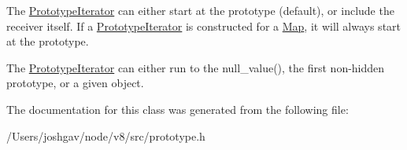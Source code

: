 The \hyperlink{classv8_1_1internal_1_1_prototype_iterator}{Prototype\+Iterator} can either start at the prototype (default), or include the receiver itself. If a \hyperlink{classv8_1_1internal_1_1_prototype_iterator}{Prototype\+Iterator} is constructed for a \hyperlink{classv8_1_1internal_1_1_map}{Map}, it will always start at the prototype.

The \hyperlink{classv8_1_1internal_1_1_prototype_iterator}{Prototype\+Iterator} can either run to the null\+\_\+value(), the first non-\/hidden prototype, or a given object. 

The documentation for this class was generated from the following file\+:\begin{DoxyCompactItemize}
\item 
/\+Users/joshgav/node/v8/src/prototype.\+h\end{DoxyCompactItemize}
